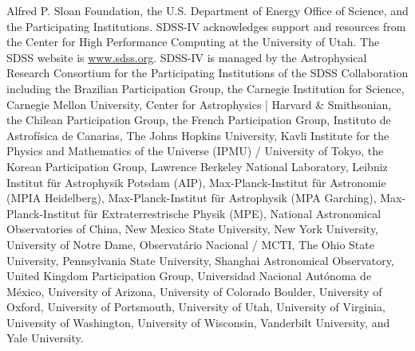 \documentclass{aa}
\begin{document}
\begin{acknowledgements}
      Alfred P. Sloan Foundation, the U.S. Department of Energy Office of
      Science, and the Participating Institutions.
      SDSS-IV acknowledges support and resources from the Center for High
      Performance Computing at the University of Utah. The SDSS
      website is \url{www.sdss.org}.
      SDSS-IV is managed by the Astrophysical Research Consortium
      for the Participating Institutions of the SDSS Collaboration including
      the Brazilian Participation Group, the Carnegie Institution for Science,
      Carnegie Mellon University, Center for Astrophysics | Harvard \&
      Smithsonian, the Chilean Participation Group, the French Participation Group,
      Instituto de Astrof\'isica de Canarias, The Johns Hopkins University, Kavli Institute for the
      Physics and Mathematics of the Universe (IPMU) / University of Tokyo, the Korean Participation Group,
      Lawrence Berkeley National Laboratory, Leibniz Institut f\"ur Astrophysik
      Potsdam (AIP),  Max-Planck-Institut f\"ur Astronomie (MPIA Heidelberg),
      Max-Planck-Institut f\"ur Astrophysik (MPA Garching), Max-Planck-Institut f\"ur
      Extraterrestrische Physik (MPE), National Astronomical Observatories of
      China, New Mexico State University, New York University, University of
      Notre Dame, Observat\'ario Nacional / MCTI, The Ohio State University, Pennsylvania State
      University, Shanghai Astronomical Observatory, United Kingdom Participation Group,
      Universidad Nacional Aut\'onoma de M\'exico, University of Arizona, University of Colorado Boulder,
      University of Oxford, University of Portsmouth, University of Utah, University of Virginia, University
      of Washington, University of Wisconsin, Vanderbilt University,
      and Yale University.
 
\end{acknowledgements}
 


 
\end{document}
